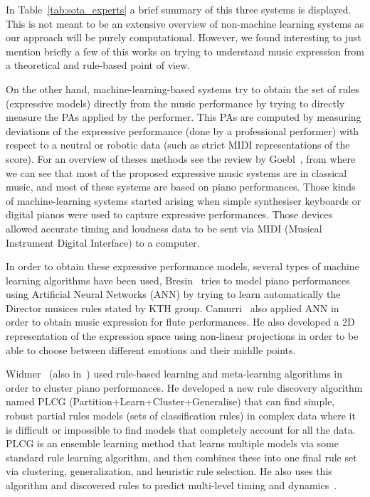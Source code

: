 In Table~\ref{tab:sota_experts} a brief summary of this three systems is displayed. This is not meant to be an extensive overview of non-machine learning systems as our approach will be purely computational. However, we found interesting to just mention briefly a few of this works on trying to understand music expression from a theoretical and rule-based point of view.



On the other hand, machine-learning-based systems try to obtain the set of rules (expressive models) directly from the music performance by trying to directly measure the PAs applied by the performer. This PAs are computed by measuring deviations of the expressive performance (done by a professional performer) with respect to a neutral or robotic data (such as strict MIDI representations of the score). For an overview of theses methods see the review by Goebl~\cite{Goebl2005}, from where we can see that most of the proposed expressive music systems are in classical music, and most of these systems are based on piano performances. Those kinds of machine-learning systems started arising when simple synthesiser keyboards or digital pianos were used to capture expressive performances. Those devices allowed accurate timing and loudness data to be sent via MIDI (Musical Instrument Digital Interface) to a computer.

In order to obtain these expressive performance models, several types of machine learning algorithms have been used, Bresin~\cite{Bresin1998} tries to model piano performances using Artificial Neural Networks (ANN) by trying to learn automatically the Director musices rules stated by KTH group. Camurri~\cite{Camurri2000} also applied ANN in order to obtain music expression for flute performances. He also developed a 2D representation of the expression space using non-linear projections in order to be able to choose between different emotions and their middle points.

Widmer~\cite{Widmer2003a} (also in~\cite{Widmer2003}) used rule-based learning and meta-learning algorithms in order to cluster piano performances. He developed a new rule discovery algorithm named PLCG (Partition+Learn+Cluster+Generalise) that can find simple, robust partial rules models (sets of classification rules) in complex data where it is difficult or impossible to find models that completely account for all the data. PLCG is an ensemble learning method that learns multiple models via some standard rule learning algorithm, and then combines these into one final rule set via clustering, generalization, and heuristic rule selection. He also uses this algorithm and discovered rules to predict multi-level timing and dynamics~\cite{Widmer2003}.

